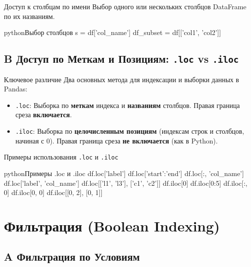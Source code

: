 \begin{myblock}{Доступ к столбцам по имени}
    Выбор одного или нескольких столбцов DataFrame по их названиям.
    \begin{codebox}{python}{Выбор столбцов}
    s = df['col_name']
    df_subset = df[['col1', 'col2']]
    \end{codebox}
\end{myblock}

\subsection{B Доступ по Меткам и Позициям: \texttt{.loc} vs \texttt{.iloc}}

\begin{textbox}{Ключевое различие}
    Два основных метода для индексации и выборки данных в Pandas:
    \begin{itemize}[nosep, leftmargin=*]
        \item \texttt{.loc}: Выборка по \textbf{меткам} индекса и \textbf{названиям} столбцов. Правая граница среза \textbf{включается}.
        \item \texttt{.iloc}: Выборка по \textbf{целочисленным позициям} (индексам строк и столбцов, начиная с 0). Правая граница среза \textbf{не включается} (как в Python).
    \end{itemize}
\end{textbox}

\begin{myexampleblock}{Примеры использования \texttt{.loc} и \texttt{.iloc}}
    \begin{codebox}{python}{Примеры .loc и .iloc}
    df.loc['label']
    df.loc['start':'end']
    df.loc[:, 'col_name']
    df.loc['label', 'col_name']
    df.loc[['l1', 'l3'], ['c1', 'c2']]
    df.iloc[0]
    df.iloc[0:5]
    df.iloc[:, 0]
    df.iloc[0, 0]
    df.iloc[[0, 2], [0, 1]]
    \end{codebox}
\end{myexampleblock}

\section{Фильтрация (Boolean Indexing)}

\subsection{A Фильтрация по Условиям}


